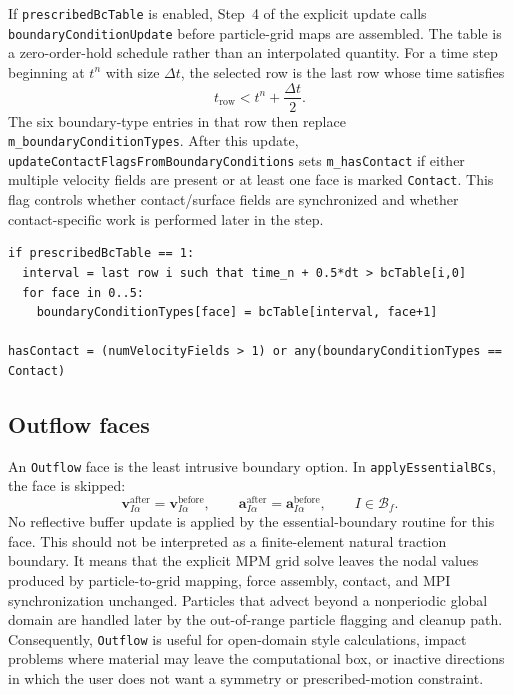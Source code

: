 If \texttt{prescribedBcTable} is enabled, Step~4 of the explicit update calls \texttt{boundaryConditionUpdate} before particle-grid maps are assembled.  The table is a zero-order-hold schedule rather than an interpolated quantity.  For a time step beginning at $t^n$ with size $\Delta t$, the selected row is the last row whose time satisfies
\begin{equation}
  t_{\mathrm{row}} < t^n+\frac{\Delta t}{2}.
  \label{eq:bc-table-selection}
\end{equation}
The six boundary-type entries in that row then replace \texttt{m\_boundaryConditionTypes}.  After this update, \texttt{updateContactFlagsFromBoundaryConditions} sets \texttt{m\_hasContact} if either multiple velocity fields are present or at least one face is marked \texttt{Contact}.  This flag controls whether contact/surface fields are synchronized and whether contact-specific work is performed later in the step.

\begin{lstlisting}[caption={Boundary-type update and contact flag refresh.}]
if prescribedBcTable == 1:
  interval = last row i such that time_n + 0.5*dt > bcTable[i,0]
  for face in 0..5:
    boundaryConditionTypes[face] = bcTable[interval, face+1]

hasContact = (numVelocityFields > 1) or any(boundaryConditionTypes == Contact)
\end{lstlisting}

\subsection{Outflow faces}
\label{subsec:bc-outflow}

An \texttt{Outflow} face is the least intrusive boundary option.  In \texttt{applyEssentialBCs}, the face is skipped:
\begin{equation}
  \mathbf{v}_{I\alpha}^{\mathrm{after}}=\mathbf{v}_{I\alpha}^{\mathrm{before}},
  \qquad
  \mathbf{a}_{I\alpha}^{\mathrm{after}}=\mathbf{a}_{I\alpha}^{\mathrm{before}},
  \qquad I\in\mathcal{B}_f.
\end{equation}
No reflective buffer update is applied by the essential-boundary routine for this face.  This should not be interpreted as a finite-element natural traction boundary.  It means that the explicit MPM grid solve leaves the nodal values produced by particle-to-grid mapping, force assembly, contact, and MPI synchronization unchanged.  Particles that advect beyond a nonperiodic global domain are handled later by the out-of-range particle flagging and cleanup path.  Consequently, \texttt{Outflow} is useful for open-domain style calculations, impact problems where material may leave the computational box, or inactive directions in which the user does not want a symmetry or prescribed-motion constraint.

